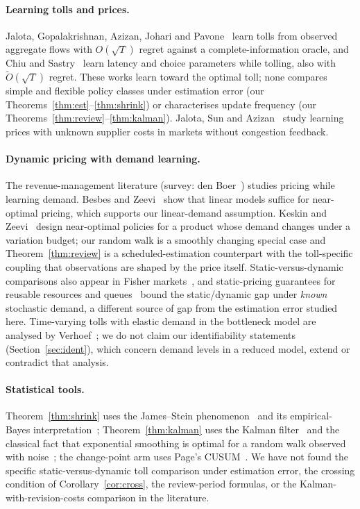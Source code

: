 \documentclass[11pt]{article}
\theoremstyle{definition}
\theoremstyle{remark}
\begin{document}
\paragraph{Learning tolls and prices.} Jalota, Gopalakrishnan, Azizan, Johari and Pavone~\cite{jalota2023routing} learn tolls from observed aggregate flows with $O(\sqrt T)$ regret against a complete-information oracle, and Chiu and Sastry~\cite{chiu2024} learn latency and choice parameters while tolling, also with $\tilde O(\sqrt T)$ regret. These works learn toward the optimal toll; none compares simple and flexible policy classes under estimation error (our Theorems~\ref{thm:est}--\ref{thm:shrink}) or characterises update frequency (our Theorems~\ref{thm:review}--\ref{thm:kalman}). Jalota, Sun and Azizan~\cite{jalota2023eq} study learning prices with unknown supplier costs in markets without congestion feedback.
\paragraph{Dynamic pricing with demand learning.} The revenue-management literature (survey: den Boer~\cite{denboer2015}) studies pricing while learning demand. Besbes and Zeevi~\cite{besbes2015} show that linear models suffice for near-optimal pricing, which supports our linear-demand assumption. Keskin and Zeevi~\cite{keskin2017} design near-optimal policies for a product whose demand changes under a variation budget; our random walk is a smoothly changing special case and Theorem~\ref{thm:review} is a scheduled-estimation counterpart with the toll-specific coupling that observations are shaped by the price itself. Static-versus-dynamic comparisons also appear in Fisher markets~\cite{jalotaye2024}, and static-pricing guarantees for reusable resources and queues~\cite{besbes2024static,bergquist2023} bound the static/dynamic gap under \emph{known} stochastic demand, a different source of gap from the estimation error studied here. Time-varying tolls with elastic demand in the bottleneck model are analysed by Verhoef~\cite{verhoef1997}; we do not claim our identifiability statements (Section~\ref{sec:ident}), which concern demand levels in a reduced model, extend or contradict that analysis.
\paragraph{Statistical tools.} Theorem~\ref{thm:shrink} uses the James--Stein phenomenon~\cite{jamesstein1961,lindley1962} and its empirical-Bayes interpretation~\cite{efronmorris1973}; Theorem~\ref{thm:kalman} uses the Kalman filter~\cite{kalman1960} and the classical fact that exponential smoothing is optimal for a random walk observed with noise~\cite{muth1960}; the change-point arm uses Page's CUSUM~\cite{page1954}. We have not found the specific static-versus-dynamic toll comparison under estimation error, the crossing condition of Corollary~\ref{cor:cross}, the review-period formulas, or the Kalman-with-revision-costs comparison in the literature.
\end{document}
